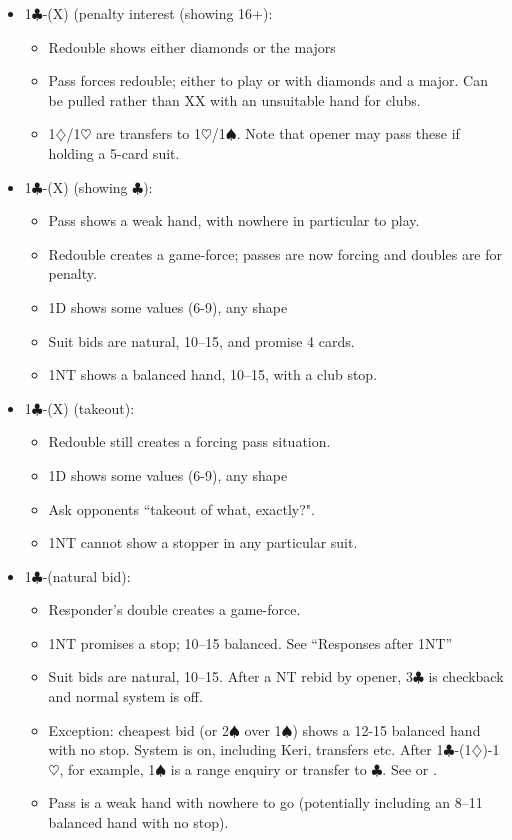 \documentclass[a4paper,14pt]{extarticle}
\begin{document}
\begin{itemize}
\item 1$\clubsuit$-(X) (penalty interest (showing 16+):
	\begin{itemize}
   \item Redouble shows either diamonds or the majors
   \item Pass forces redouble; either to play or with diamonds and a major. Can be pulled rather than XX with an unsuitable hand for clubs.
   \item 1$\diamondsuit$/1$\heartsuit$ are transfers to 1$\heartsuit$/1$\spadesuit$.  Note that opener may pass these if holding a 5-card 
      suit.
	\end{itemize}
\item 1$\clubsuit$-(X) (showing $\clubsuit$):
	\begin{itemize}
   \item Pass shows a weak hand, with nowhere in particular to play.
   \item Redouble creates a game-force; passes are now forcing and doubles are for penalty.
	\item 1D shows some values (6-9), any shape
   \item Suit bids are natural, 10--15, and promise 4 cards.
   \item 1NT shows a balanced hand, 10--15, with a club stop.
	\end{itemize}
\item 1$\clubsuit$-(X) (takeout):
	\begin{itemize}
   \item Redouble still creates a forcing pass situation.
	\item 1D shows some values (6-9), any shape
   \item Ask opponents ``takeout of what, exactly?".
   \item 1NT cannot show a stopper in any particular suit.
	\end{itemize}
\item 1$\clubsuit$-(natural bid):
	\begin{itemize}
   \item Responder's double creates a game-force.
   \item 1NT promises a stop; 10--15 balanced. See ``Responses after 1NT'' 
   \item Suit bids are natural, 10--15. After a NT rebid by opener, 3$\clubsuit$ is checkback and normal system is off. 
   \item Exception: cheapest bid (or 2$\spadesuit$ over 1$\spadesuit$) shows a 12-15 balanced hand with no stop.  System is on, including Keri, transfers etc.  After 1$\clubsuit$-(1$\diamondsuit$)-1$\heartsuit$, for example, 1$\spadesuit$ is a range enquiry or transfer to $\clubsuit$. See  or .
   \item Pass is a weak hand with nowhere to go (potentially including an 8--11 balanced hand with no stop).
	\end{itemize}
\end{itemize}
\end{document}
